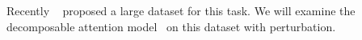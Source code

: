 Recently ~\cite{BowmanAngeliPotts2015} proposed a large dataset for this task. We will examine
the decomposable attention model~\cite{parikh2016emnlp} on this dataset with perturbation.



